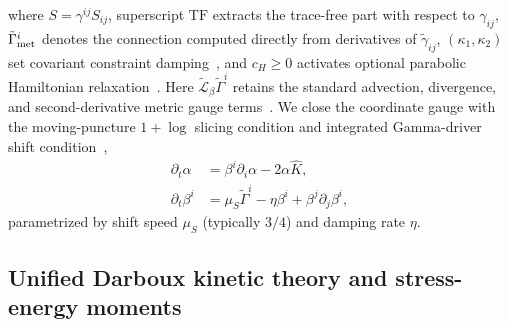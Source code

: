 where $S = \gamma^{ij} S_{ij}$, superscript $\mathrm{TF}$ extracts the trace-free part with respect to $\gamma_{ij}$, $\tilde{\Gamma}^i_{\rm met}$ denotes the connection computed directly from derivatives of $\tilde{\gamma}_{ij}$, $(\kappa_1, \kappa_2)$ set covariant constraint damping~\cite{Gundlach:2005eh}, and $c_H \ge 0$ activates optional parabolic Hamiltonian relaxation~\cite{Duez:2002bn,Etienne:2024ncu}. Here $\tilde{\mathcal{L}}_\beta\tilde{\Gamma}^i$ retains the standard advection, divergence, and second-derivative metric gauge terms~\cite{Hilditch:2012fp,Zhu:2024utz}. We close the coordinate gauge with the moving-puncture $1+\log$ slicing condition and integrated Gamma-driver shift condition~\cite{Bona:1994dr,Alcubierre:2002kk,Campanelli:2005dd,Baker:2005vv,vanMeter:2006vi},
\begin{align}\label{eq:puncture_gauge}
\partial_t \alpha &= \beta^i \partial_i \alpha - 2\alpha \hat{K}, \nonumber\\
\partial_t \beta^i &= \mu_S \tilde{\Gamma}^i - \eta \beta^i + \beta^j \partial_j \beta^i,
\end{align}
parametrized by shift speed $\mu_S$ (typically $3/4$) and damping rate $\eta$.

\subsection{Unified Darboux kinetic theory and stress-energy moments}\label{sec:system_darboux}

